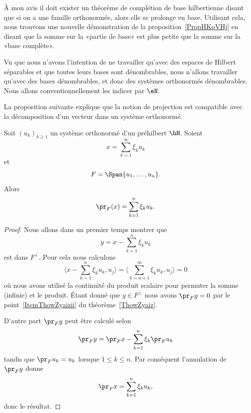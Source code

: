\begin{remark}  \label{RemfdJcQF}
	À mon avis il doit exister un théorème de complétion de base hilbertienne disant que si on a une famille orthonormée, alors elle se prolonge en base. Utilisant cela, nous trouvons une nouvelle démonstration de la proposition~\ref{PropHKqVHj} en disant que la somme sur la «partie de base» est plus petite que la somme sur la «base complète».
\end{remark}

\begin{normaltext}
	Vu que nous n'avons l'intention de ne travailler qu'avec des espaces de Hilbert séparables et que toutes leurs bases sont dénombrables, nous n'allons travailler qu'avec des bases dénombrables, et donc des systèmes orthonormés dénombrables. Nous allons conventionnellement les indicer par \( \eN\).
\end{normaltext}

La proposition suivante explique que la notion de projection est compatible avec la décomposition d'un vecteur dans un système orthonormé.
\begin{proposition}
	Soit \( (u_k)_{k\geq 1}\) un système orthonormé d'un préhilbert \( \hH\). Soient
	\begin{equation}
		x=\sum_{k=1}^{\infty}\xi_ku_k
	\end{equation}
	et
	\begin{equation}
		F=\Span\{ u_1,\ldots, u_n \}.
	\end{equation}
	Alors
	\begin{equation}
		\pr_F(x)=\sum_{k=1}^n\xi_ku_k.
	\end{equation}
\end{proposition}

\begin{proof}
	Nous allons dans un premier temps montrer que
	\begin{equation}
		y=x-\sum_{k=1}^n\xi_ku_k
	\end{equation}
	est dans \( F^{\perp}\). Pour cela nous calculons
	\begin{equation}
		\langle x-\sum_{k=1}^n\xi_ku_k,u_j \rangle =\langle \sum_{k=n+1}^{\infty}\xi_ku_k, u_j\rangle =0
	\end{equation}
	où nous avons utilisé la continuité du produit scalaire pour permuter la somme (infinie) et le produit. Étant donné que \( y\in F^{\perp}\) nous avons \( \pr_Fy=0\) par le point~\ref{ItemThowZyaizii} du théorème~\ref{ThowZyaiz}.

	D'autre part \( \pr_Fy\) peut être calculé selon
	\begin{equation}
		\pr_Fy=\pr_Fx-\sum_{k=1}^n\xi_k\pr_Fu_k
	\end{equation}
	tandis que \( \pr_Fu_k=u_k\) lorsque \( 1\leq k\leq n\). Par conséquent l'annulation de \( \pr_Fy\) donne
	\begin{equation}
		\pr_Fx=\sum_{k=1}^n\xi_ku_k,
	\end{equation}
	donc le résultat.
\end{proof}

